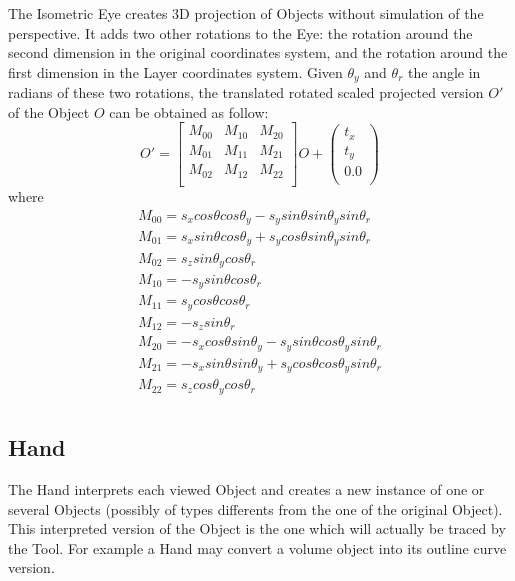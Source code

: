 The Isometric Eye creates 3D projection of Objects without simulation of the perspective. It adds two other rotations to the Eye: the rotation around the second dimension in the original coordinates system, and the rotation around the first dimension in the Layer coordinates system. Given $\theta_y$ and $\theta_r$ the angle in radians of these two rotations, the translated rotated scaled projected version $O'$ of the Object $O$ can be obtained as follow:\\
\begin{equation}
O'=\left[\begin{array}{ccc}
M_{00}&M_{10}&M_{20}\\
M_{01}&M_{11}&M_{21}\\
M_{02}&M_{12}&M_{22}\\
\end{array}
\right]O+\left(
\begin{array}{c}
t_x\\
t_y\\
0.0\\
\end{array}\right)
\end{equation}
where\\
\begin{equation}
\begin{array}{c}
M_{00}=s_xcos\theta cos\theta_y-s_ysin\theta sin\theta_ysin\theta_r\\
M_{01}=s_xsin\theta cos\theta_y+s_ycos\theta sin\theta_ysin\theta_r\\
M_{02}=s_zsin\theta_ycos\theta_r\\
M_{10}=-s_ysin\theta cos\theta_r\\
M_{11}=s_ycos\theta cos\theta_r\\
M_{12}=-s_zsin\theta_r\\
M_{20}=-s_xcos\theta sin\theta_y-s_ysin\theta cos\theta_ysin\theta_r\\
M_{21}=-s_xsin\theta sin\theta_y+s_ycos\theta cos\theta_ysin\theta_r\\
M_{22}=s_zcos\theta_ycos\theta_r\\
\end{array}
\end{equation}

\subsection{Hand}

The Hand interprets each viewed Object and creates a new instance of one or several Objects (possibly of types differents from the one of the original Object). This interpreted version of the Object is the one which will actually be traced by the Tool. For example a Hand may convert a volume object into its outline curve version.\\

